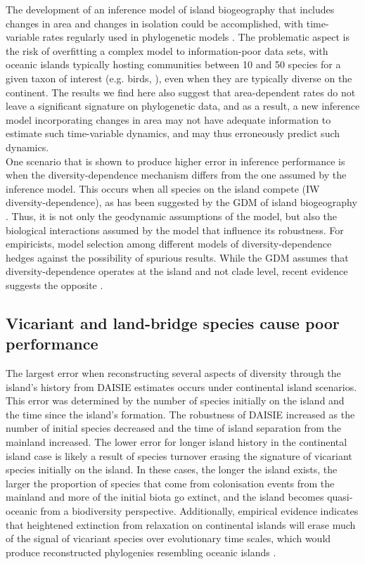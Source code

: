 \documentclass{article}
\begin{document}
The development of an inference model of island biogeography that includes changes in area and changes in isolation could be accomplished, with time-variable rates regularly used in phylogenetic models \citep{condamine_assessing_2019}. The problematic aspect is the risk of overfitting a complex model to information-poor data sets, with oceanic islands typically hosting communities between 10 and 50 species for a given taxon of interest (e.g. birds, \cite{valente_simple_2020}), even when they are typically diverse on the continent. The results we find here also suggest that area-dependent rates do not leave a significant signature on phylogenetic data, and as a result, a new inference model incorporating changes in area may not have adequate information to estimate such time-variable dynamics, and may thus erroneously predict such dynamics. \\

One scenario that is shown to produce higher error in inference performance is when the diversity-dependence mechanism differs from the one assumed by the inference model. This occurs when all species on the island compete (IW diversity-dependence), as has been suggested by the GDM of island biogeography \citep{whittaker_general_2008}. Thus, it is not only the geodynamic assumptions of the model, but also the biological interactions assumed by the model that influence its robustness. For empiricists, model selection among different models of diversity-dependence \citep{etienne_limits_2022} hedges against the possibility of spurious results. While the GDM assumes that diversity-dependence operates at the island and not clade level, recent evidence suggests the opposite \citep{etienne_limits_2022}. \\

\subsection*{Vicariant and land-bridge species cause poor performance}

The largest error when reconstructing several aspects of diversity through the island’s history from DAISIE estimates occurs under continental island scenarios. This error was determined by the number of species initially on the island and the time since the island’s formation. The robustness of DAISIE increased as the number of initial species decreased and the time of island separation from the mainland increased. The lower error for longer island history in the continental island case is likely a result of species turnover erasing the signature of vicariant species initially on the island. In these cases, the longer the island exists, the larger the proportion of species that come from colonisation events from the mainland and more of the initial biota go extinct, and the island becomes quasi-oceanic from a biodiversity perspective. Additionally, empirical evidence indicates that heightened extinction from relaxation on continental islands will erase much of the signal of vicariant species over evolutionary time scales, which would produce reconstructed phylogenies resembling oceanic islands \citep{diamond_biogeographic_1972, halley_dynamics_2016}.\\
\end{document}
